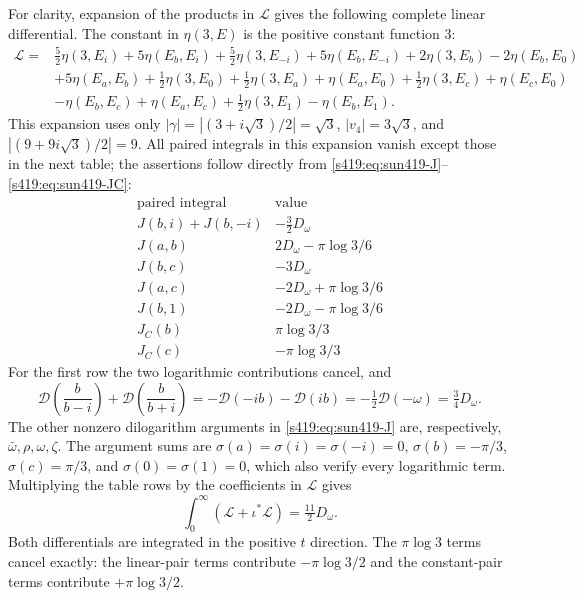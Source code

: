 \documentclass[11pt,a4paper]{article}
\theoremstyle{remark}\newtheorem{remark}[theorem]{Remark}
\numberwithin{equation}{section}
\begin{document}
For clarity, expansion of the products in $\mathcal L$ gives the
following complete linear differential. The constant in $\eta(3,E)$
is the positive constant function $3$:
\begin{align*}
 \mathcal L={}&\tfrac52\eta(3,E_i)+5\eta(E_b,E_i)
 +\tfrac52\eta(3,E_{-i})+5\eta(E_b,E_{-i})
 +2\eta(3,E_b)-2\eta(E_b,E_0)\\
 &+5\eta(E_a,E_b)+\tfrac12\eta(3,E_0)
 +\tfrac12\eta(3,E_a)+\eta(E_a,E_0)
 +\tfrac12\eta(3,E_c)+\eta(E_c,E_0)\\
 &-\eta(E_b,E_c)+\eta(E_a,E_c)
 +\tfrac12\eta(3,E_1)-\eta(E_b,E_1).
\end{align*}
This expansion uses only
$|\gamma|=|{(3+i\sqrt3)}/{2}|=\sqrt3$,
$|v_4|=3\sqrt3$, and
$|{(9+9i\sqrt3)}/{2}|=9$.
All paired integrals in this expansion vanish except those in the next
table; the assertions follow directly from
\eqref{s419:eq:sun419-J}--\eqref{s419:eq:sun419-JC}:
\[
\begin{array}{c|c}
 \text{paired integral}&\text{value}\\\hline
 J(b,i)+J(b,-i)&-\tfrac32D_\omega\\
 J(a,b)&2D_\omega-\pi\log3/6\\
 J(b,c)&-3D_\omega\\
 J(a,c)&-2D_\omega+\pi\log3/6\\
 J(b,1)&-2D_\omega-\pi\log3/6\\
 J_C(b)&\pi\log3/3\\
 J_C(c)&-\pi\log3/3
\end{array}
\]
For the first row the two logarithmic contributions cancel, and
\[
 \mathcal D\left(\frac{b}{b-i}\right)+
 \mathcal D\left(\frac{b}{b+i}\right)
 =-\mathcal D(-ib)-\mathcal D(ib)
 =-\tfrac12\mathcal D(-\omega)=\tfrac34D_\omega.
\]
The other nonzero dilogarithm arguments in
\eqref{s419:eq:sun419-J} are, respectively,
$\bar\omega,\rho,\omega,\zeta$.
The argument sums are $\sigma(a)=\sigma(i)=\sigma(-i)=0$,
$\sigma(b)=-\pi/3$, $\sigma(c)=\pi/3$,
and $\sigma(0)=\sigma(1)=0$, which also verify every logarithmic term.
Multiplying the table rows by the coefficients in $\mathcal L$ gives
\[
 \int_0^\infty(\mathcal L+\iota^*\mathcal L)
 =\tfrac{11}{2}D_\omega.
\]
Both differentials are integrated in the positive $t$ direction.
The $\pi\log3$ terms cancel
exactly: the linear-pair terms contribute $-\pi\log3/2$ and the
constant-pair terms contribute $+\pi\log3/2$.
\end{document}
